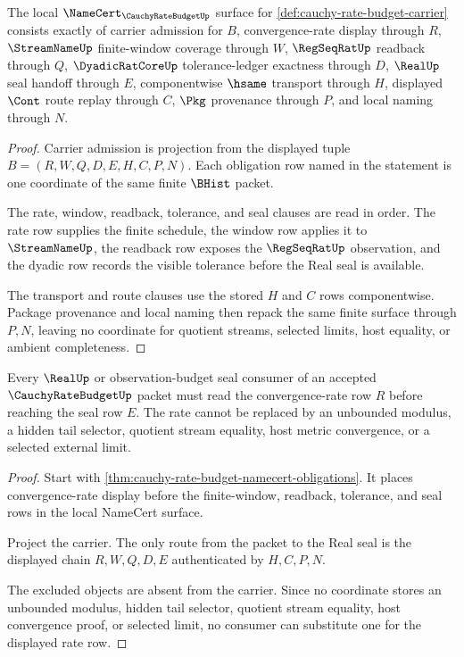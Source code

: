 \begin{theorem}
\label{thm:cauchy-rate-budget-namecert-obligations}
The local $\NameCert_{\CauchyRateBudgetUp}$ surface for \autoref{def:cauchy-rate-budget-carrier} consists exactly of carrier admission for $B$, convergence-rate display through $R$, $\StreamNameUp$ finite-window coverage through $W$, $\RegSeqRatUp$ readback through $Q$, $\DyadicRatCoreUp$ tolerance-ledger exactness through $D$, $\RealUp$ seal handoff through $E$, componentwise $\hsame$ transport through $H$, displayed $\Cont$ route replay through $C$, $\Pkg$ provenance through $P$, and local naming through $N$.
\end{theorem}
\begin{proof}
Carrier admission is projection from the displayed tuple $B=(R,W,Q,D,E,H,C,P,N)$. Each obligation row named in the statement is one coordinate of the same finite $\BHist$ packet.

The rate, window, readback, tolerance, and seal clauses are read in order. The rate row supplies the finite schedule, the window row applies it to $\StreamNameUp$, the readback row exposes the $\RegSeqRatUp$ observation, and the dyadic row records the visible tolerance before the Real seal is available.

The transport and route clauses use the stored $H$ and $C$ rows componentwise. Package provenance and local naming then repack the same finite surface through $P,N$, leaving no coordinate for quotient streams, selected limits, host equality, or ambient completeness.
\end{proof}

\begin{theorem}
\label{thm:cauchy-rate-budget-rate-nonescape}
Every $\RealUp$ or observation-budget seal consumer of an accepted $\CauchyRateBudgetUp$ packet must read the convergence-rate row $R$ before reaching the seal row $E$. The rate cannot be replaced by an unbounded modulus, a hidden tail selector, quotient stream equality, host metric convergence, or a selected external limit.
\end{theorem}
\begin{proof}
Start with \autoref{thm:cauchy-rate-budget-namecert-obligations}. It places convergence-rate display before the finite-window, readback, tolerance, and seal rows in the local NameCert surface.

Project the carrier. The only route from the packet to the Real seal is the displayed chain $R,W,Q,D,E$ authenticated by $H,C,P,N$.

The excluded objects are absent from the carrier. Since no coordinate stores an unbounded modulus, hidden tail selector, quotient stream equality, host convergence proof, or selected limit, no consumer can substitute one for the displayed rate row.
\end{proof}

